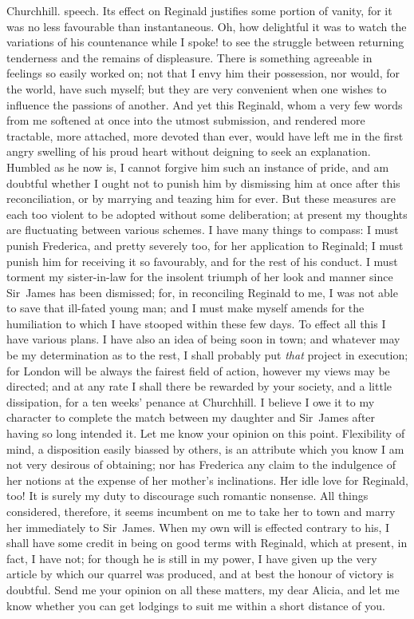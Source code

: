 \begin{mail}{Churchhill.}{}
speech. Its effect on Reginald justifies some portion of vanity, for it was no less favourable than instantaneous. Oh, how delightful it was to watch the variations of his countenance while I spoke! to see the struggle between returning tenderness and the remains of displeasure. There is something agreeable in feelings so easily worked on; not that I envy him their possession, nor would, for the world, have such myself; but they are very convenient when one wishes to influence the passions of another. And yet this Reginald, whom a very few words from me softened at once into the utmost submission, and rendered more tractable, more attached, more devoted than ever, would have left me in the first angry swelling of his proud heart without deigning to seek an explanation. Humbled as he now is, I cannot forgive him such an instance of pride, and am doubtful whether I ought not to punish him by dismissing him at once after this reconciliation, or by marrying and teazing him for ever. But these measures are each too violent to be adopted without some deliberation; at present my thoughts are fluctuating between various schemes. I have many things to compass: I must punish Frederica, and pretty severely too, for her application to Reginald; I must punish him for receiving it so favourably, and for the rest of his conduct. I must torment my sister-in-law for the insolent triumph of her look and manner since Sir~James has been dismissed; for, in reconciling Reginald to me, I was not able to save that ill-fated young man; and I must make myself amends for the humiliation to which I have stooped within these few days. To effect all this I have various plans. I have also an idea of being soon in town; and whatever may be my determination as to the rest, I shall probably put \textit{that} project in execution; for London will be always the fairest field of action, however my views may be directed; and at any rate I shall there be rewarded by your society, and a little dissipation, for a ten weeks' penance at Churchhill. I believe I owe it to my character to complete the match between my daughter and Sir~James after having so long intended it. Let me know your opinion on this point. Flexibility of mind, a disposition easily biassed by others, is an attribute which you know I am not very desirous of obtaining; nor has Frederica any claim to the indulgence of her notions at the expense of her mother's inclinations. Her idle love for Reginald, too! It is surely my duty to discourage such romantic nonsense. All things considered, therefore, it seems incumbent on me to take her to town and marry her immediately to Sir~James. When my own will is effected contrary to his, I shall have some credit in being on good terms with Reginald, which at present, in fact, I have not; for though he is still in my power, I have given up the very article by which our quarrel was produced, and at best the honour of victory is doubtful. Send me your opinion on all these matters, my dear Alicia, and let me know whether you can get lodgings to suit me within a short distance of you. 

\end{mail}